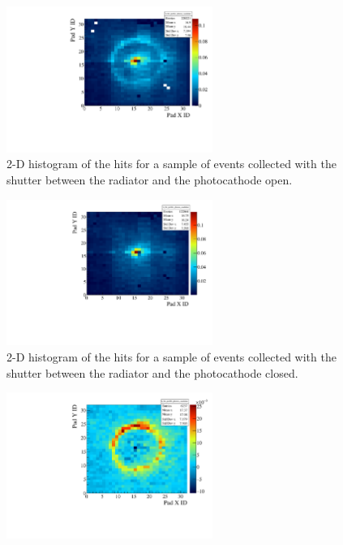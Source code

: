 \begin{enumerate}
\begin{figure}
			\begin{center}
			\includegraphics[width=0.6\textwidth]
                			{INFN_plots/Iris_open_Ar_CH4}
				\caption{\label{fig:Iris_open_Ar_CH4}
              2-D histogram of the hits for a sample of events collected with the shutter between the radiator and the photocathode open.}
			\end{center}
            \end{figure} 
\begin{figure}
			\begin{center}
			\includegraphics[width=0.6\textwidth]
                			{INFN_plots/Iris_closed_Ar_CH4}
				\caption{\label{fig:Iris_closed_Ar_CH4}
             2-D histogram of the hits for a sample of events collected with the shutter between the radiator and the photocathode closed.  }
			\end{center}
            \end{figure} 
\begin{figure}
			\begin{center}
			\includegraphics[width=0.6\textwidth]                	{INFN_plots/subtraction_open_close_Ar_CH4_2D-2}

\end{center}
\end{figure}
\end{enumerate}
